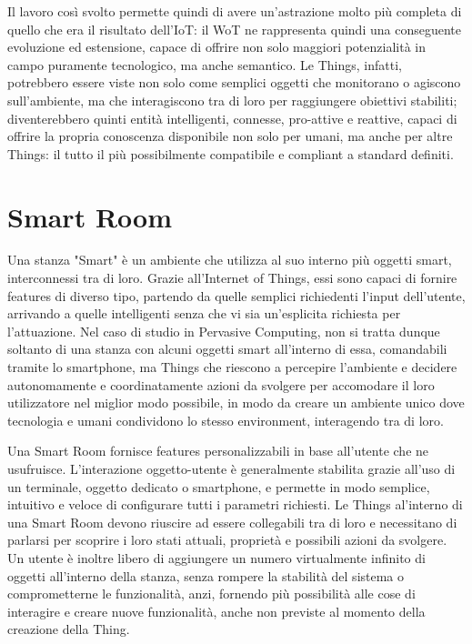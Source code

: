 \documentclass[12pt,a4paper,openright,oneside]{report}
\begin{document}
Il lavoro così svolto permette quindi di avere un'astrazione molto più completa di quello che era il risultato dell'IoT: il WoT ne rappresenta quindi una conseguente evoluzione ed estensione, capace di offrire non solo maggiori potenzialità in campo puramente tecnologico, ma anche semantico. Le Things, infatti, potrebbero essere viste non solo come semplici oggetti che monitorano o agiscono sull'ambiente, ma che interagiscono tra di loro per raggiungere obiettivi stabiliti; diventerebbero quinti entità intelligenti, connesse, pro-attive e reattive, capaci di offrire la propria conoscenza disponibile non solo per umani, ma anche per altre Things: il tutto il più possibilmente compatibile e compliant a standard definiti.

\section{Smart Room}
Una stanza "Smart" \cite{smartroom} è un ambiente che utilizza al suo interno più oggetti smart, interconnessi tra di loro. Grazie all'Internet of Things, essi sono capaci di fornire features di diverso tipo, partendo da quelle semplici richiedenti l'input dell'utente, arrivando a quelle intelligenti senza che vi sia un'esplicita richiesta per l'attuazione. Nel caso di studio in Pervasive Computing, non si tratta dunque soltanto di una stanza con alcuni oggetti smart all'interno di essa, comandabili tramite lo smartphone, ma Things che riescono a percepire l'ambiente e decidere autonomamente e coordinatamente azioni da svolgere per accomodare il loro utilizzatore nel miglior modo possibile, in modo da creare un ambiente unico dove tecnologia e umani condividono lo stesso environment, interagendo tra di loro.

Una Smart Room fornisce features personalizzabili in base all'utente che ne usufruisce. L'interazione oggetto-utente è generalmente stabilita grazie all'uso di un terminale, oggetto dedicato o smartphone, e permette in modo semplice, intuitivo e veloce di configurare tutti i parametri richiesti. Le Things al'interno di una Smart Room devono riuscire ad essere collegabili tra di loro e necessitano di parlarsi per scoprire i loro stati attuali, proprietà e possibili azioni da svolgere. Un utente è inoltre libero di aggiungere un numero virtualmente infinito di oggetti all'interno della stanza, senza rompere la stabilità del sistema o comprometterne le funzionalità, anzi, fornendo più possibilità alle cose di interagire e creare nuove funzionalità, anche non previste al momento della creazione della Thing.
\end{document}
